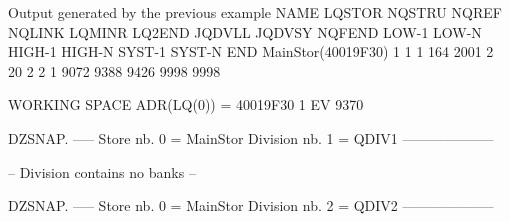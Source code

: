 \begin{Listing}{Output generated by the previous example}
  NAME       LQSTOR NQSTRU  NQREF NQLINK LQMINR LQ2END JQDVLL JQDVSY NQFEND  LOW-1  LOW-N HIGH-1 HIGH-N SYST-1 SYST-N    END     
 MainStor(40019F30)      1      1      1    164   2001      2     20      2      2      1   9072   9388   9426   9998   9998     
                                                                                                                                 
 WORKING SPACE   ADR(LQ(0)) = 40019F30                                                                                           
          1    EV        9370                                                                                                    
                                                                                                                                 
DZSNAP.   -----  Store nb. 0 = MainStor Division nb. 1 = QDIV1                       --------------------                        
                                                                                                                                 
         -- Division contains no banks --                                                                                        
                                                                                                                                 
DZSNAP.   -----  Store nb. 0 = MainStor Division nb. 2 = QDIV2                       --------------------                        
                                                                                                                                 

\end{Listing}
